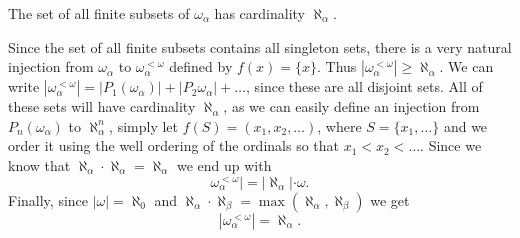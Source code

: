 \begin{problem}
  The set of all finite subsets of $\omega_{\alpha}$ has cardinality $\aleph_{\alpha}$.
\end{problem}

\begin{solution}
  Since the set of all finite subsets contains all singleton sets, there is a very natural injection from $\omega_{\alpha}$ to $\omega_{\alpha}^{<\omega}$ defined by $f(x) = \{x\}$.
  Thus $|\omega_{\alpha}^{<\omega}| \ge \aleph_{\alpha}$.
  We can write $|\omega_{\alpha}^{<\omega}| = |P_1 (\omega_{\alpha})| + |P_2 \omega_{\alpha}| + \ldots$, since these are all disjoint sets.
  All of these sets will have cardinality $\aleph_{\alpha}$, as we can easily define an injection from $P_n (\omega_{\alpha})$ to $\aleph_{\alpha}^{n}$, simply let $f(S) = (x_1, x_2, \ldots)$, where $S = \{x_1, \ldots\}$ and we order it using the well ordering of the ordinals so that $x_1 < x_2 < \ldots$.
  Since we know that $\aleph_{\alpha} \cdot \aleph_{\alpha} = \aleph_{\alpha}$ we end up with
  \[\omega_{\alpha}^{<\omega}| = |\aleph_{\alpha}| \cdot \omega.\]
  Finally, since $|\omega| = \aleph_0$ and $\aleph_{\alpha} \cdot \aleph_{\beta} = \max (\aleph_{\alpha}, \aleph_{\beta})$ we get
  \[|\omega_{\alpha}^{<\omega}| = \aleph_{\alpha}.\]
\end{solution}

